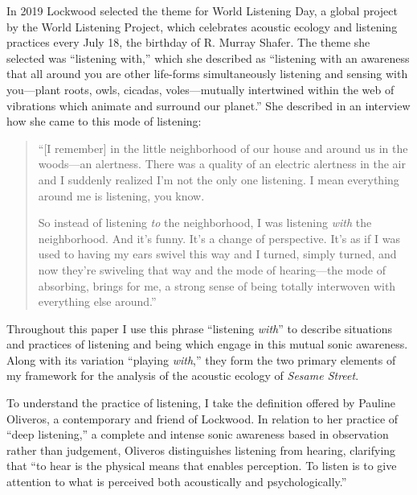 \documentclass[12pt,letterpaper]{article}
\begin{document}
	In 2019 Lockwood selected the theme for World Listening Day, a global
	project by the World Listening Project, which celebrates acoustic 
	ecology and listening practices every July 18, the birthday of R. 
	Murray Shafer. The theme she selected was ``listening with,'' which she
	described as ``listening with an awareness that all around you are other
	life-forms simultaneously listening and sensing with you---plant roots,
	owls, cicadas, voles---mutually intertwined within the web of vibrations
	which animate and surround our planet.''\autocite{WLP} She described in 
	an interview how she came to this mode of listening:

	\begin{quote}
	``[I remember] in the little neighborhood of our house and around us 
	in the 
	woods---an alertness. There was a quality of an electric alertness in 
	the air and I suddenly realized I'm not the only one listening. I mean 
	everything around me is listening, you know.
	
	So instead of listening \textit{to} the neighborhood, I was listening 
	\textit{with} the neighborhood. And it's funny. It's a change of 
	perspective. It's as if I was used to having my ears swivel this way and
	I turned, simply turned, and now they're swiveling that way and the mode
	of hearing---the mode of absorbing, brings for me, a strong sense of 
	being totally interwoven with everything else 
	around.''\autocite{WLPVimeo} 
	\end{quote}

	Throughout this paper I use this phrase ``listening \textit{with}'' to
	describe situations and practices of listening and being which
	engage in this mutual sonic awareness. Along with its variation 
	``playing \textit{with},'' they form the two primary elements of my
	framework for the analysis of the acoustic ecology of 
	\textit{Sesame Street}. 

	To understand the practice of listening, I take the definition offered 
	by Pauline Oliveros, a contemporary and friend of 
	Lockwood.\autocite[116]{Rodgers} In relation to her practice of ``deep 
	listening,'' a complete and intense sonic awareness based in observation
	rather than judgement, Oliveros distinguishes listening from hearing, 
	clarifying that ``to hear is the physical means that enables perception.
	To listen is to give attention to what is perceived both acoustically 
	and psychologically.''\autocite[33/366, As things stand today, e-books
	are basically useless for academic research because they lack, of all
	things, page numbers. At its bare-bones, a synthetic work like this
	methodology section is just a long list of page numbers, which makes 
	my reading habbits slightly unhealthy. I'm going to go back and find
	the page numbers in the hard cover edition, but for now, I will list
	them as fractions.]{Odell}  
\end{document}
